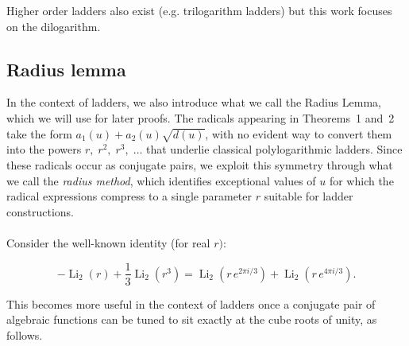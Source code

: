 \documentclass[12pt]{article}
\begin{document}
\remark Higher order ladders also exist (e.g. trilogarithm ladders) but this  work focuses on the dilogarithm.


\subsection{Radius lemma}

In the context of ladders, we also introduce what we call the Radius Lemma, which we will use for later proofs. The radicals appearing in Theorems~1 and~2 take the form $a_1(u)+a_2(u)\sqrt{d(u)}$, with no evident way to convert them into the powers $r,\; r^2,\; r^3,\;\ldots$ that underlie classical polylogarithmic ladders. Since these radicals occur as conjugate pairs, we exploit this symmetry through what we call the
\emph{radius method}, which identifies exceptional values of \(u\) for which
the radical expressions compress to a single parameter \(r\) suitable for
ladder constructions.
\\
\\

\noindent Consider the well-known identity (for real $r)$:

\begin{equation*}\label{eq:cuberoot}
    -\operatorname{Li}_2(r) + \frac{1}{3}\operatorname{Li}_2\!\left(r^3\right)
    = \operatorname{Li}_2\!\left(r\,e^{2\pi i/3}\right) + \operatorname{Li}_2\!\left(r\,e^{4\pi i/3}\right).
\end{equation*}

\noindent This becomes more useful in the context of ladders once a conjugate pair of algebraic functions can be tuned to sit exactly at the cube roots of unity, as follows.
\end{document}
